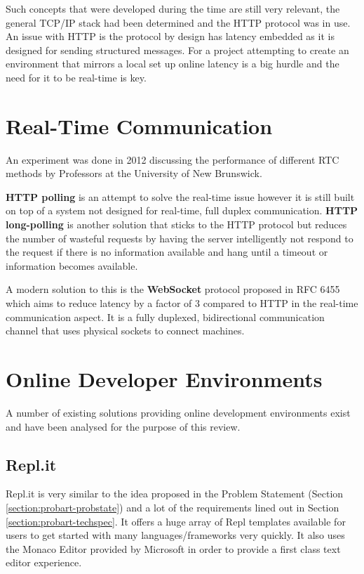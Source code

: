 Such concepts that were developed during the time are still very relevant, the general TCP/IP stack had been determined and the HTTP protocol was in use. An issue with HTTP is the protocol by design has latency embedded as it is designed for sending structured messages. For a project attempting to create an environment that mirrors a local set up online latency is a big hurdle and the need for it to be real-time is key. 

\section{Real-Time Communication} \label{lit-web}

An experiment was done in 2012 discussing the performance of different RTC methods by Professors at the University of New Brunswick\cite{websocket}.

\textbf{HTTP polling} is an attempt to solve the real-time issue however it is still built on top of a system not designed for real-time, full duplex communication. \textbf{HTTP long-polling} is another solution that sticks to the HTTP protocol but reduces the number of wasteful requests by having the server intelligently not respond to the request if there is no information available and hang until a timeout or information becomes available.

A modern solution to this is the \textbf{WebSocket} protocol proposed in RFC 6455 \cite{wsrfc} which aims to reduce latency by a factor of 3 compared to HTTP in the real-time communication aspect. It is a fully duplexed, bidirectional communication channel that uses physical sockets to connect machines.


\section{Online Developer Environments} \label{lit-ode}

A number of existing solutions providing online development environments exist and have been analysed for the purpose of this review.

\subsection{Repl.it}

Repl.it is very similar to the idea proposed in the Problem Statement (Section \ref{section:probart-probstate}) and a lot of the requirements lined out in Section \ref{section:probart-techspec}. It offers a huge array of Repl templates available for users to get started with many languages/frameworks very quickly. It also uses the Monaco Editor provided by Microsoft in order to provide a first class text editor experience.

